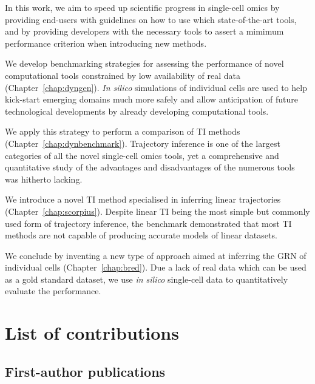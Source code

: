 In this work, we aim to speed up scientific progress in single-cell omics by providing end-users with guidelines on how to use which state-of-the-art tools, and by providing developers with the necessary tools to assert a mimimum performance criterion when introducing new methods.

We develop benchmarking strategies for assessing the performance of novel computational tools constrained by low availability of real data (Chapter~\ref{chap:dyngen}). \textit{In silico} simulations of individual cells are used to help kick-start emerging domains much more safely and allow anticipation of future technological developments by already developing computational tools.

We apply this strategy to perform a comparison of TI methods (Chapter~\ref{chap:dynbenchmark}). Trajectory inference is one of the largest categories of all the novel single-cell omics tools, yet a comprehensive and quantitative study of the advantages and disadvantages of the numerous tools was hitherto lacking. 

We introduce a novel TI method specialised in inferring linear trajectories (Chapter~\ref{chap:scorpius}).
Despite linear TI being the most simple but commonly used form of trajectory inference, the benchmark demonstrated that most TI methods are not capable of producing accurate models of linear datasets.

We conclude by inventing a new type of approach aimed at inferring the GRN of individual cells (Chapter~\ref{chap:bred}).
Due a lack of real data which can be used as a gold standard dataset, we use \textit{in silico} single-cell data to quantitatively evaluate the performance.



\section{List of contributions}

\subsection{First-author publications}


